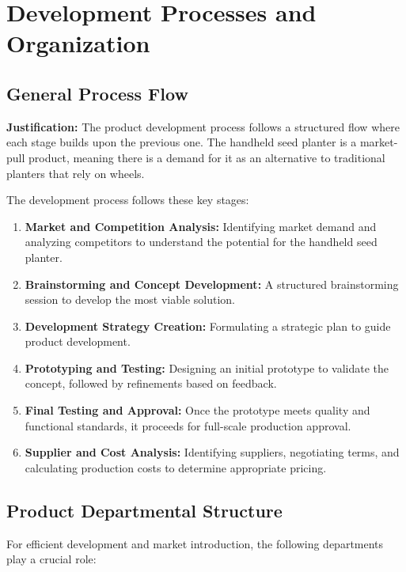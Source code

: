 \section{Development Processes and Organization}

\subsection{General Process Flow}

\textbf{Justification:}  
The product development process follows a structured flow where each stage builds upon the previous one. The handheld seed planter is a market-pull product, meaning there is a demand for it as an alternative to traditional planters that rely on wheels.

The development process follows these key stages:
\begin{enumerate}
    \item \textbf{Market and Competition Analysis:} Identifying market demand and analyzing competitors to understand the potential for the handheld seed planter.
    \item \textbf{Brainstorming and Concept Development:} A structured brainstorming session to develop the most viable solution.
    \item \textbf{Development Strategy Creation:} Formulating a strategic plan to guide product development.
    \item \textbf{Prototyping and Testing:} Designing an initial prototype to validate the concept, followed by refinements based on feedback.
    \item \textbf{Final Testing and Approval:} Once the prototype meets quality and functional standards, it proceeds for full-scale production approval.
    \item \textbf{Supplier and Cost Analysis:} Identifying suppliers, negotiating terms, and calculating production costs to determine appropriate pricing.
\end{enumerate}

\subsection{Product Departmental Structure}

For efficient development and market introduction, the following departments play a crucial role:

